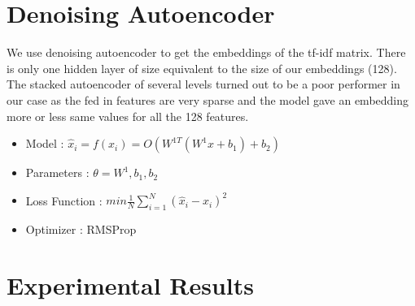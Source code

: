 \section{Denoising Autoencoder}
\label{sec:architecture_att}
We use denoising autoencoder to get the embeddings of the tf-idf matrix. There is only one hidden layer of size equivalent to the size of our embeddings (128). The stacked autoencoder of several levels turned out to be a poor performer in our case as the fed in features are very sparse and the model gave an embedding more or less same values for all the 128 features. \par
\begin{itemize}
    \item Model : $ \hat{x}_{i} = f(x_{i}) = O(W^{1 T}(W^{1}x+b_{1})+b_{2}) $
    \item Parameters : $\theta = W^{1}, b_{1}, b_{2} $
    \item Loss Function : $
        min \frac{1}{N} \sum_{i=1}^{N}(\hat{x}_{i}-x_{i})^2
        $
    \item Optimizer : RMSProp
\end{itemize}

\section{Experimental Results}
\label{sec:results_att}
